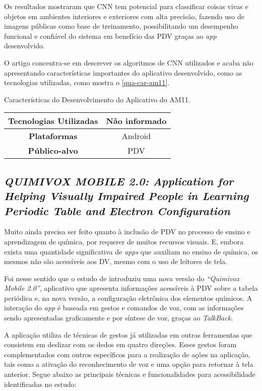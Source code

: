 Os resultados mostraram que CNN tem potencial para classificar coisas vivas e objetos em ambientes interiores e exteriores com alta precisão, fazendo uso de imagens públicas
como base de treinamento, possibilitando um desempenho funcional e confiável do sistema em benefício das PDV graças ao \emph{app} desenvolvido.

O artigo concentra-se em descrever os algoritmos de CNN utilizados e acaba não apresentando características importantes
do aplicativo desenvolvido, como as tecnologias utilizadas, como mostra o \autoref{qua-car-am11}.

\begin{quadro}[htb!]
  \caption{\label{qua-car-am11}Características do Desenvolvimento do Aplicativo do AM11.}
  \begin{tabular}{|c|c|}
    \hline
    \textbf{Tecnologias Utilizadas} & Não informado \\ \hline
    \textbf{Plataformas}            & Android       \\ \hline
    \textbf{Público-alvo}           & PDV           \\
    \hline
  \end{tabular}
\end{quadro}

\subsection{\emph{QUIMIVOX MOBILE 2.0: Application for Helping Visually Impaired People in Learning Periodic Table and Electron Configuration}}

Muito ainda precisa ser feito quanto à inclusão de PDV no processo de ensino e aprendizagem de química, por requerer de muitos recursos visuais.
E, embora exista uma quantidade significativa de \emph{apps} que auxiliam no ensino de química, os mesmos não são acessíveis aos DV, mesmo com o uso de leitores de tela.

Foi nesse sentido que o estudo de  introduziu uma nova versão do \emph{``Quimivox Mobile 2.0''},
aplicativo que apresenta informações acessíveis à PDV sobre a tabela periódica e, na nova versão, a configuração eletrônica
dos elementos químicos. A interação do \emph{app} é baseada em gestos e comandos de voz, com as informações sendo apresentadas
graficamente e por síntese de voz, graças ao \emph{TalkBack}.

A aplicação utiliza de técnicas de gestos já utilizadas em outras ferramentas que consistem em deslizar com os dedos em quatro
direções. Esses gestos foram complementados com outros específicos para a realização de ações na aplicação, tais como a ativação
do reconhecimento de voz e uma opção para retornar à tela anterior.
Segue abaixo as principais técnicas e funcionalidades para acessibilidade identificadas no estudo:

